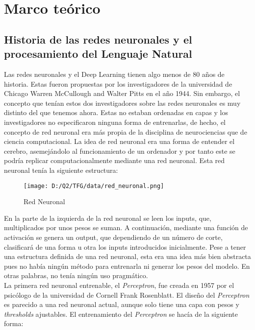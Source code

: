 \documentclass[10pt,riqno,a4paper,twoside]{article}\usepackage[]{graphicx}\usepackage[]{color}
\begin{document}
\section{Marco te\'{o}rico}

\subsection{Historia de las redes neuronales y el procesamiento del Lenguaje Natural}

Las redes neuronales y el Deep Learning tienen algo menos de 80 años de historia. Estas fueron propuestas por los investigadores de la universidad de Chicago Warren McCullough and Walter Pitts en el año 1944. Sin embargo, el concepto que tenían estos dos investigadores sobre las redes neuronales es muy distinto del que tenemos ahora. Estas no estaban ordenadas en capas y los investigadores no especificaron ninguna forma de entrenarlas, de hecho, el concepto de red neuronal era m\'{a}s propia de la disciplina de neurociencias que de ciencia computacional. La idea de red neuronal era una forma de entender el cerebro, asemejándolo al funcionamiento de un ordenador y por tanto este se podr\'{i}a replicar computacionalmente mediante una red neuronal. Esta red neuronal ten\'{i}a la siguiente estructura: 


\begin{figure}[h]
  \caption{Red Neuronal}
  \begin{center}
\texttt{[image: D:/Q2/TFG/data/red\_neuronal.png]}
\end{center}
\end{figure}


En la parte de la izquierda de la red neuronal se leen los inputs, que, multiplicados por unos pesos se suman. A continuación, mediante una funci\'{o}n de activaci\'{o}n se genera un output, que dependiendo de un número de corte, clasificar\'{a} de una forma u otra los inputs introducidos inicialmente. Pese a tener una estructura definida de una red neuronal, esta era una idea más bien abstracta pues no había ningún método para entrenarla ni generar los pesos del modelo. En otras palabras, no tenía ningún uso pragm\'{a}tico.\\ 


La primera red neuronal entrenable, el \textit{Perceptron}, fue creada en 1957 por el psic\'{o}logo de la universidad de Cornell Frank Rosenblatt. El diseño del \textit{Perceptron} es parecido a una red neuronal actual, aunque solo tiene una capa con pesos y \textit{thresholds} ajustables. El entrenamiento del \textit{Perceptron} se hac\'{i}a de la siguiente forma: 
\end{document}
